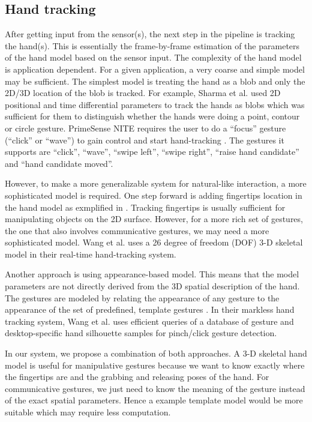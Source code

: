 \subsection{Hand tracking}
After getting input from the sensor(s), the next step in the pipeline is
tracking the hand(s). This is essentially the frame-by-frame estimation of the
parameters of the hand model based on the sensor input. The complexity of the
hand model is application dependent. For a given application, a very coarse and
simple model may be sufficient. The simplest model is treating the hand as a
blob and only the 2D/3D location of the blob is tracked. For example, Sharma et
al. \cite{sharma00} used 2D positional and time differential parameters to track
the hands as blobs which was sufficient for them to distinguish whether the
hands were doing a point, contour or circle gesture. PrimeSense NITE requires the user to do a ``focus'' gesture (``click'' or
``wave'') to gain control and start hand-tracking \cite{primesense-manual}. The
gestures it supports are ``click'', ``wave'', ``swipe left'', ``swipe right'',
``raise hand candidate'' and ``hand candidate moved''.

However, to make a more generalizable system for natural-like interaction, a
more sophisticated model is required. One step forward is adding fingertips
location in the hand model as exmplified in \cite{Oka02} \cite{harrison11}
\cite{larson11}. Tracking fingertips is usually sufficient for manipulating
objects on the 2D surface. However, for a more rich set of gestures, the one
that also involves communicative gestures, we may need a more sophisticated
model. Wang et al. \cite{Wang09} uses a 26 degree of freedom (DOF) 3-D skeletal
model in their real-time hand-tracking system. 

Another approach is using appearance-based model. This means that the model
parameters are not directly derived from the 3D spatial description of the hand.
The gestures are modeled by relating the appearance of any gesture to the 
appearance of the set of predefined, template gestures \cite{Pavlovic97}. In
their markless hand tracking system, Wang et al. \cite{wang11} uses efficient
queries of a database of gesture and desktop-specific hand silhouette samples
for pinch/click gesture detection.

In our system, we propose a combination of both approaches. A 3-D skeletal hand
model is useful for manipulative gestures because we want to know exactly where
the fingertips are and the grabbing and releasing poses of the hand. For
communicative gestures, we just need to know the meaning of the gesture instead
of the exact spatial parameters. Hence a example template model would be more
suitable which may require less computation.

